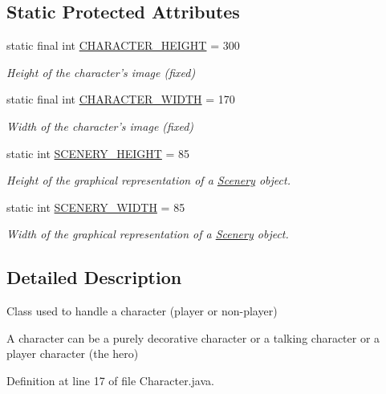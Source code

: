 \subsection*{Static Protected Attributes}
\begin{DoxyCompactItemize}
\item 
static final int \hyperlink{a00005_a31596c03022d61aeb8aac56f149309be}{C\-H\-A\-R\-A\-C\-T\-E\-R\-\_\-\-H\-E\-I\-G\-H\-T} = 300
\begin{DoxyCompactList}\small\item\em Height of the character's image (fixed) \end{DoxyCompactList}\item 
static final int \hyperlink{a00005_a2a46ba03b3e10896b7757f891336e8b8}{C\-H\-A\-R\-A\-C\-T\-E\-R\-\_\-\-W\-I\-D\-T\-H} = 170
\begin{DoxyCompactList}\small\item\em Width of the character's image (fixed) \end{DoxyCompactList}\item 
static int \hyperlink{a00024_a106e53ae6e1647395740237ccce7f363}{S\-C\-E\-N\-E\-R\-Y\-\_\-\-H\-E\-I\-G\-H\-T} = 85
\begin{DoxyCompactList}\small\item\em Height of the graphical representation of a \hyperlink{a00024}{Scenery} object. \end{DoxyCompactList}\item 
static int \hyperlink{a00024_affb047c028883c6d069a03ef0f1caeb8}{S\-C\-E\-N\-E\-R\-Y\-\_\-\-W\-I\-D\-T\-H} = 85
\begin{DoxyCompactList}\small\item\em Width of the graphical representation of a \hyperlink{a00024}{Scenery} object. \end{DoxyCompactList}\end{DoxyCompactItemize}


\subsection{Detailed Description}
Class used to handle a character (player or non-\/player) 

A character can be a purely decorative character or a talking character or a player character (the hero) 

Definition at line 17 of file Character.\-java.



